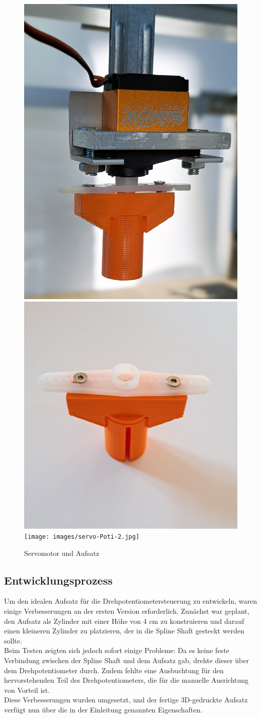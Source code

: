 \begin{figure}[H]
	\centering
	\includegraphics[width=0.3\linewidth]{images/Servomotor+Aufsatz.jpg}
	\includegraphics[width=0.39\linewidth]{images/Aufsatz-Servo.jpg}
	\texttt{[image: images/servo-Poti-2.jpg]}
	\caption[Servomotor und Aufsatz]{Servomotor und Aufsatz}
	\label{fig:Servomotor und Aufsatz}
\end{figure}



\subsection{Entwicklungsprozess}
Um den idealen Aufsatz für die Drehpotentiometersteuerung zu entwickeln, waren einige Verbesserungen an der ersten Version erforderlich. Zunächst war geplant, den Aufsatz als Zylinder mit einer Höhe von 4 cm zu konstruieren und darauf einen kleineren Zylinder zu platzieren, der in die Spline Shaft gesteckt werden sollte. \\
Beim Testen zeigten sich jedoch sofort einige Probleme: Da es keine feste Verbindung zwischen der Spline Shaft und dem Aufsatz gab, drehte dieser über dem Drehpotentiometer durch. Zudem fehlte eine Ausbuchtung für den hervorstehenden Teil des Drehpotentiometers, die für die manuelle Ausrichtung von Vorteil ist.\\
Diese Verbesserungen wurden umgesetzt, und der fertige 3D-gedruckte Aufsatz verfügt nun über die in der Einleitung genannten Eigenschaften.


